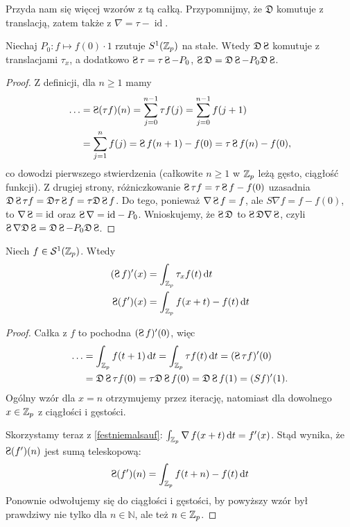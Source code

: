 Przyda  nam się więcej wzorów z tą całką.
Przypomnijmy, że $\mathfrak D$ komutuje z translacją, zatem także z $\nabla = \tau - \operatorname{id}$.

\begin{fakt}
	Niechaj $P_0 \colon f \mapsto f(0) \cdot 1$ rzutuje $S^1(\mathbb Z_p)$ na stałe.
	Wtedy $\mathfrak D\suma $ komutuje z translacjami $\tau_x$, a dodatkowo $\suma  \tau = \tau \suma  - P_0$, $\suma \mathfrak D = \mathfrak D\suma  - P_0\mathfrak D\suma $.
\end{fakt}

\begin{proof}
	Z definicji, dla $n \ge 1$ mamy
	\begin{align*}
		\dots & = \suma (\tau f)(n) = \sum_{j=0}^{n-1} \tau f(j) = \sum_{j=0}^{n-1} f(j+1) \\
		& = \sum_{j = 1}^{n} f(j) = \suma f(n+1) - f(0) = \tau \suma f(n) - f(0),
	\end{align*}
	co dowodzi pierwszego stwierdzenia (całkowite $n \ge 1$ w $\mathbb Z_p$ leżą gęsto, ciągłość funkcji).
	Z drugiej strony, różniczkowanie $\suma \tau f=  \tau \suma f - f(0)$ uzasadnia $\mathfrak D\suma \tau f = \mathfrak D \tau \suma f = \tau \mathfrak D \suma f$.
	Do tego, ponieważ $\nabla \suma f = f$, ale $S \nabla f = f - f(0)$, to $\nabla \suma = \textrm{id}$ oraz $\suma \nabla = \textrm{id} - P_0$.
	Wnioskujemy, że $\suma \mathfrak D$ to $\suma \mathfrak D \nabla \suma$, czyli $\suma \nabla \mathfrak D \suma = \mathfrak D \suma - P_0 \mathfrak D\suma$.
\end{proof}

\begin{fakt} %
	Niech $f \in \mathcal S^1(\mathbb Z_p)$. Wtedy
	\begin{align*}
		(\suma f)'(x) & = \intzp \tau_x f(t)\,\textrm{d}t \\
		\suma(f')(x)  & = \intzp f(x+t) - f(t) \,\textrm{d}t
	\end{align*}
\end{fakt}

\begin{proof}
	Całka z $f$ to pochodna $(\suma f)'(0)$, więc
	\begin{align*}
		\ldots & = \intzp f(t+1) \,\textrm{d}t = \intzp \tau f(t) \,\textrm{d}t = (\suma \tau f)'(0) \\
		& = \mathfrak D \suma \tau f(0) = \tau \mathfrak D \suma f(0) = \mathfrak D \suma f(1) = (Sf)'(1).
	\end{align*}
	Ogólny wzór dla $x = n$ otrzymujemy przez iterację, natomiast dla dowolnego $x \in \mathbb Z_p$ z ciągłości i gęstości.

	Skorzystamy teraz z \ref{festniemalsauf}: $\int_{\mathbb Z_p} \operatorname{\nabla} f(x + t) \,\textrm{d}t = f'(x)$.
	Stąd wynika, że $\suma (f')(n)$ jest sumą teleskopową:
	\[
		\suma(f')(n) = \intzp f(t+n) - f(t) \,\textrm{d}t
	\]
	Ponownie odwołujemy się do ciągłości i gęstości, by powyższy wzór był prawdziwy nie tylko dla $n \in \mathbb N$, ale też $n \in \mathbb Z_p$.
\end{proof}

